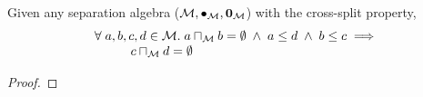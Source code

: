 %
%
\begin{lemma}[]\label{lem:noMeetByOrder}
Given any separation algebra ($\mathcal{M}, \bullet_{\mathcal{M}}, \mathbf{0}_{\mathcal{M}}$) with the cross-split property,
\[
\begin{array}{l}
	\forall\; a, b, c, d \in \mathcal{M}.\; a \sqcap_{\mathcal{M}} b = \emptyset \;\land\; a \leq d \;\land\; b \leq c \implies \\
	\hspace*{1cm} c \sqcap_{\mathcal{M}} d = \emptyset
\end{array}
\]
%
\begin{proof}
\todo
\end{proof}
\end{lemma}
%
%


